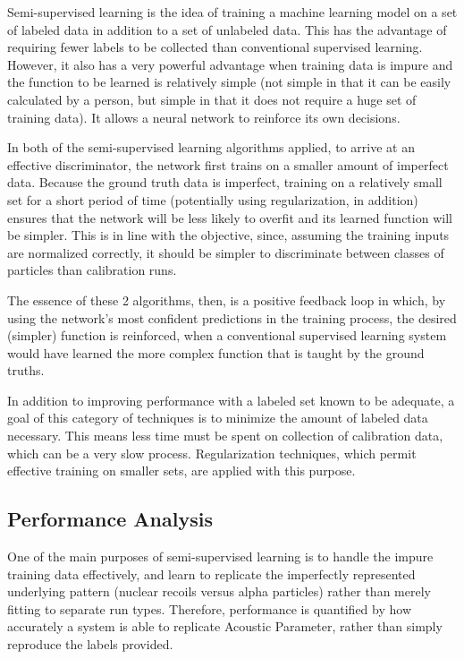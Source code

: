 \documentclass[10pt]{article}
\begin{document}
Semi-supervised learning is the idea of training a machine learning model on a set of labeled data in addition to a set of unlabeled data. This has the advantage of requiring fewer labels to be collected than conventional supervised learning. However, it also has a very powerful advantage when training data is impure and the function to be learned is relatively simple (not simple in that it can be easily calculated by a person, but simple in that it does not require a huge set of training data). It allows a neural network to reinforce its own decisions.

In both of the semi-supervised learning algorithms applied, to arrive at an effective discriminator, the network first trains on a smaller amount of imperfect data. Because the ground truth data is imperfect, training on a relatively small set for a short period of time (potentially using regularization, in addition) ensures that the network will be less likely to overfit and its learned function will be simpler. This is in line with the objective, since, assuming the training inputs are normalized correctly, it should be simpler to discriminate between classes of particles than calibration runs.

The essence of these 2 algorithms, then, is a positive feedback loop in which, by using the network's most confident predictions in the training process, the desired (simpler) function is reinforced, when a conventional supervised learning system would have learned the more complex function that is taught by the ground truths.

In addition to improving performance with a labeled set known to be adequate, a goal of this category of techniques is to minimize the amount of labeled data necessary. This means less time must be spent on collection of calibration data, which can be a very slow process. Regularization techniques, which permit effective training on smaller sets, are applied with this purpose.

\subsection{Performance Analysis}

One of the main purposes of semi-supervised learning is to handle the impure training data effectively, and learn to replicate the imperfectly represented underlying pattern (nuclear recoils versus alpha particles) rather than merely fitting to separate run types. Therefore, performance is quantified by how accurately a system is able to replicate Acoustic Parameter, rather than simply reproduce the labels provided.
\end{document}
